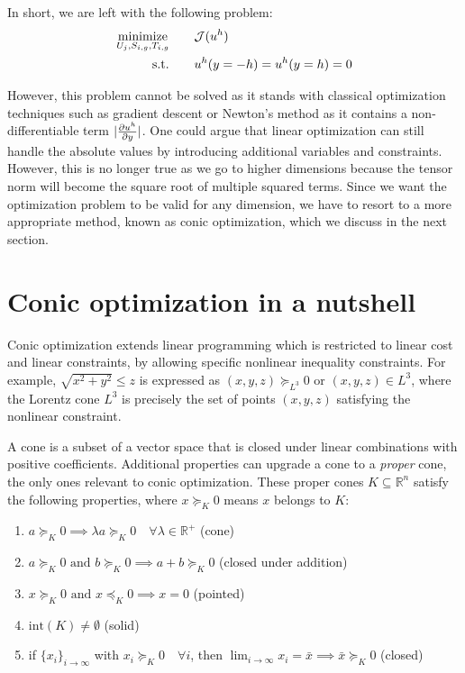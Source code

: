 \documentclass[11 pt]{report}
\begin{document}
In short, we are left with the following problem:
\begin{equation}
    \begin{aligned}
        \operatorname*{minimize}_{U_j,S_{i,g}, T_{i,g}} \qquad & \mathcal{J}(u^h)\\
        \textrm{s.t.} \qquad & u^h(y=-h) = u^h(y=h) = 0
    \end{aligned}\label{eq:problem_1D_nonlinear}
\end{equation}

However, this problem cannot be solved as it stands with classical optimization techniques such as gradient descent or Newton's method as it contains a non-differentiable term $|\pdv{u^h}{y}|$. One could argue that linear optimization can still handle the absolute values by introducing additional variables and constraints. However, this is no longer true as we go to higher dimensions because the tensor norm will become the square root of multiple squared terms. Since we want the optimization problem to be valid for any dimension, we have to resort to a more appropriate method, known as conic optimization, which we discuss in the next section.


\section{Conic optimization in a nutshell}
Conic optimization extends linear programming which is restricted to linear cost and linear constraints, by allowing specific nonlinear inequality constraints. For example, $\sqrt{x^2+y^2} \leq z$ is expressed as $(x,y,z) \succeq_{L^3} 0$ or $(x,y,z) \in L^3$, where the Lorentz cone $L^3$ is precisely the set of points $(x,y,z)$ satisfying the nonlinear constraint.

A cone is a subset of a vector space that is closed under linear combinations with positive coefficients. Additional properties can upgrade a cone to a \textit{proper} cone, the only ones relevant to conic optimization. These proper cones $K\subseteq \mathbb{R}^n$ satisfy the following properties, where $x \succeq_K 0$ means $x$ belongs to $K$:
\begin{enumerate}
    \item $a \succeq_K 0 \implies \lambda a \succeq_K 0 \quad \forall \lambda \in \mathbb{R}^+$ (cone)
    \item $a \succeq_K 0 \text{ and } b \succeq_K 0 \implies a + b \succeq_K 0$ (closed under addition)
    \item $x \succeq_K 0 \text{ and } x \preceq_K 0 \implies x = 0$ (pointed)
    \item $\textrm{int}(K) \neq \emptyset$ (solid)
    \item if $\{x_i\}_{i\to\infty}$ with $x_i \succeq_K 0 \quad \forall i$, then $\lim_{i\to\infty} x_i = \bar x \implies \bar x \succeq_K 0$ (closed)
\end{enumerate}
\end{document}
